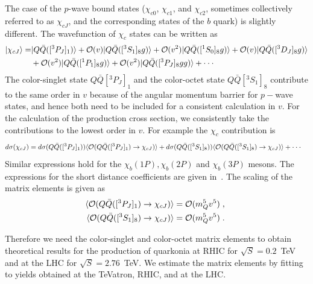 \documentclass[article,showpacs,preprintnumbers,amsmath,amssymb]{revtex4}
\newcommand{\barQ}{{\bar{Q}}}
\newcommand{\calO}{{\cal{O}}}
\begin{document}
The case of the $p$-wave bound states ($\chi_{c0}$, $\chi_{c1}$, and
$\chi_{c2}$, sometimes collectively referred to as $\chi_{cJ}$, and the
corresponding states of the $b$ quark) is slightly
different. The wavefunction of $\chi_c$ states can be written as
\begin{equation}
\begin{split}
|\chi_{cJ}\rangle = & |Q\barQ([^3P_J]_{1})\rangle 
  + \calO(v)|Q\barQ([^3S_1]_{8}g)\rangle
  + \calO(v^2)|Q\barQ([^1S_0]_{8}g)\rangle
  + \calO(v)|Q\barQ([^3D_J]_{8}g)\rangle\\
  &+ \calO(v^2)|Q\barQ([^1P_1]_{8}g)\rangle
  + \calO(v^2)|Q\barQ([^3P_J]_{8}gg)\rangle
  +\cdot\cdot\cdot
  \label{eq:chifock}
\end{split}
\end{equation}
The color-singlet state $Q\barQ[^3P_J]_{1}$ and the color-octet state
$Q\barQ[^3S_1]_{8}$ contribute to the same order in $v$ because of the angular
momentum barrier for $p-$wave states, and hence both need to be included for a consistent
calculation in $v$.  For the calculation of the production cross section, we
consistently take the contributions to the lowest order in $v$.
For example the $\chi_{c}$ contribution is
\begin{equation}
\begin{split}
d\sigma(\chi_{cJ}) &= d\sigma(Q\barQ([^3P_J]_{1}))
                  \langle \calO(Q\barQ([^3P_J]_{1})\rightarrow \chi_{cJ})\rangle 
                +  d\sigma(Q\barQ([^3S_1]_{8}))
                  \langle \calO(Q\barQ([^3S_1]_{8})\rightarrow \chi_{cJ})\rangle
                + \cdot\cdot\cdot  
\label{eq:dsigmachi}
\end{split}
\end{equation}
Similar expressions hold for the $\chi_b(1P), \chi_b(2P)$ and $\chi_b(3P)$ 
mesons. The expressions for the short distance coefficients are given
in~\cite{Cho:1995vh}. The scaling of the matrix elements is given as
\begin{equation}
\begin{split}
\langle \calO(Q\barQ([^3P_J]_{1})\rightarrow \chi_{cJ})\rangle &= 
\calO(m_Q^5 v^5) \;,\\
\langle \calO(Q\barQ([^3S_1]_{8})\rightarrow \chi_{cJ})\rangle &= 
\calO(m_Q^5 v^5)\;.~\label{eq:scalingschi}
\end{split}
\end{equation}

Therefore we need the color-singlet and color-octet matrix elements
to obtain theoretical results for the production of quarkonia at RHIC for
$\sqrt{S}=0.2$~TeV and at the LHC for $\sqrt{S}=2.76$~TeV. We estimate the matrix
elements by fitting to yields obtained at the TeVatron, RHIC, and at the LHC.
\end{document}
